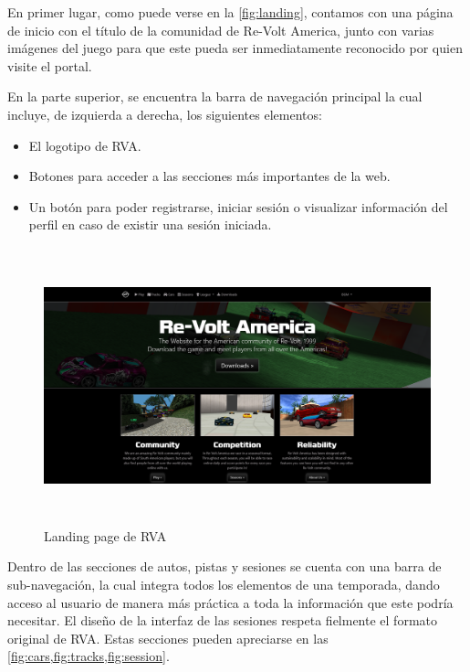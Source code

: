 En primer lugar, como puede verse en la \autoref{fig:landing}, contamos con una página de inicio con el título de la comunidad de Re-Volt America, junto con varias imágenes del juego para que este pueda ser inmediatamente reconocido por quien visite el portal.

En la parte superior, se encuentra la barra de navegación principal la cual incluye, de izquierda a derecha, los siguientes elementos:
\begin{itemize}
  \item El logotipo de RVA.
  \item Botones para acceder a las secciones más importantes de la web.
  \item Un botón para poder registrarse, iniciar sesión o visualizar información del perfil en caso de existir una sesión iniciada.
\end{itemize}

\begin{figure}[H]
  \begin{center}
    \includegraphics[width=15cm, height=8cm]{img/landing.png} 
  \end{center}
  \caption[Landing page de RVA]{Landing page de RVA}
  \label{fig:landing}
\end{figure}

Dentro de las secciones de autos, pistas y sesiones se cuenta con una barra de sub-navegación, la cual integra todos los elementos de una temporada, dando acceso al usuario de manera más práctica a toda la información que este podría necesitar. El diseño de la interfaz de las sesiones respeta fielmente el formato original de RVA. Estas secciones pueden apreciarse en las \cref{fig:cars,fig:tracks,fig:session}.

